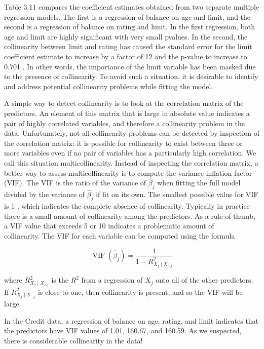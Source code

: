 \documentclass[10pt]{article}
\begin{document}
Table 3.11 compares the coefficient estimates obtained from two separate multiple regression models. The first is a regression of balance on age and limit, and the second is a regression of balance on rating and limit. In the first regression, both age and limit are highly significant with very small pvalues. In the second, the collinearity between limit and rating has caused the standard error for the limit coefficient estimate to increase by a factor of 12 and the p-value to increase to 0.701 . In other words, the importance of the limit variable has been masked due to the presence of collinearity. To avoid such a situation, it is desirable to identify and address potential collinearity problems while fitting the model.

A simple way to detect collinearity is to look at the correlation matrix of the predictors. An element of this matrix that is large in absolute value indicates a pair of highly correlated variables, and therefore a collinearity problem in the data. Unfortunately, not all collinearity problems can be detected by inspection of the correlation matrix: it is possible for collinearity to exist between three or more variables even if no pair of variables has a particularly high correlation. We call this situation multicollinearity. Instead of inspecting the correlation matrix, a better way to assess multicollinearity is to compute the variance inflation factor (VIF). The VIF is the ratio of the variance of $\hat{\beta}_{j}$ when fitting the full model divided by the variance of $\hat{\beta}_{j}$ if fit on its own. The smallest possible value for VIF is 1 , which indicates the complete absence of collinearity. Typically in practice there is a small amount of collinearity among the predictors. As a rule of thumb, a VIF value that exceeds 5 or 10 indicates a problematic amount of\\
collinearity. The VIF for each variable can be computed using the formula

$$
\operatorname{VIF}\left(\hat{\beta}_{j}\right)=\frac{1}{1-R_{X_{j} \mid X_{-j}}^{2}}
$$

where $R_{X_{j} \mid X_{-j}}^{2}$ is the $R^{2}$ from a regression of $X_{j}$ onto all of the other predictors. If $R_{X_{j} \mid X_{-j}}^{2}$ is close to one, then collinearity is present, and so the VIF will be large.

In the Credit data, a regression of balance on age, rating, and limit indicates that the predictors have VIF values of 1.01, 160.67, and 160.59. As we suspected, there is considerable collinearity in the data!
\end{document}
